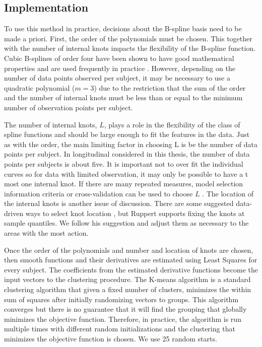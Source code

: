\subsection{Implementation}
To use this method in practice, decisions about the B-spline basis need to be made a priori. First, the order of the polynomials must be chosen. This together with the number of internal knots impacts the flexibility of the B-spline function. Cubic B-splines of order four have been shown to have good mathematical properties and are used frequently in practice \cite{james2003}. However, depending on the number of data points observed per subject, it may be necessary to use a quadratic polynomial ($m = 3$) due to the restriction that the sum of the order and the number of internal knots must be less than or equal to the minimum number of observation points per subject. 

The number of internal knots, $L$, plays a role in the flexibility of the class of spline functions and should be large enough to fit the features in the data. Just as with the order, the main limiting factor in choosing L is be the number of data points per subject. In longitudinal considered in this thesis, the number of data points per subjects is about five. It is important not to over fit the individual curves so for data with limited observation, it may only be possible to have a t most one internal knot. If there are many repeated measures, model selection information criteria or cross-validation can be used to choose $L$ \cite{rice2001}. The location of the internal knots is another issue of discussion. There are some suggested data-driven ways to select knot location \cite{shanggang2001}, but Ruppert \cite{ruppert2002} supports fixing the knots at sample quantiles. We follow his suggestion and adjust them as necessary to the areas with the most action. 

Once the order of the polynomials and number and location of knots are chosen, then smooth functions and their derivatives are estimated using Least Squares for every subject. The coefficients from the estimated derivative functions become the input vectors to the clustering procedure. The K-means algorithm is a standard clustering algorithm that given a fixed number of clusters, minimizes the within sum of squares after initially randomizing vectors to groups. This algorithm converges but there is no guarantee that it will find the grouping that globally minimizes the objective function. Therefore, in practice, the algorithm is run multiple times with different random initializations and the clustering that minimizes the objective function is chosen. We use 25 random starts.

